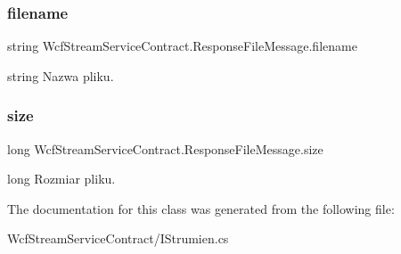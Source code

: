 \subsubsection{\texorpdfstring{filename}{filename}}
{\footnotesize\ttfamily string Wcf\+Stream\+Service\+Contract.\+Response\+File\+Message.\+filename}



string Nazwa pliku. 

\mbox{\label{class_wcf_stream_service_contract_1_1_response_file_message_a0092bddf2bf3874bb0e4293893543e8f}} 
\subsubsection{\texorpdfstring{size}{size}}
{\footnotesize\ttfamily long Wcf\+Stream\+Service\+Contract.\+Response\+File\+Message.\+size}



long Rozmiar pliku. 



The documentation for this class was generated from the following file\+:\begin{DoxyCompactItemize}
\item 
Wcf\+Stream\+Service\+Contract/I\+Strumien.\+cs\end{DoxyCompactItemize}
